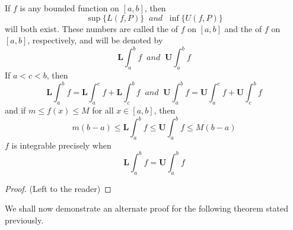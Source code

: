 \documentclass[12pt, a4paper, oneside, openright, titlepage]{book}
\begin{document}
\begin{rmk}
    If $f$ is any bounded function on $[a,b]$, then \begin{equation}
        \sup\{L(f,P)\}\;\;and\;\;\inf\{U(f,P)\}
    \end{equation}
    will both exist. These numbers are called the  of $f$ on $[a,b]$ and the  of $f$ on $[a,b]$, respectively, and will be denoted by \begin{equation}
        \mathbf{L}\int_a^bf\;\;and\;\;\mathbf{U}\int_a^bf
    \end{equation}
    If $a < c < b$, then \begin{equation}
        \mathbf{L}\int_a^bf = \mathbf{L}\int_a^cf + \mathbf{L}\int_c^bf\;\;and\;\;\mathbf{U}\int_a^bf = \mathbf{U}\int_a^cf + \mathbf{U}\int_c^bf
    \end{equation}
    and if $m \leq f(x) \leq M$ for all $x \in [a,b]$, then \begin{equation}
        m(b-a)\leq \mathbf{L}\int_a^bf \leq \mathbf{U}\int_a^bf\leq M(b-a)
    \end{equation}
    $f$ is integrable precisely when \begin{equation}
        \mathbf{L}\int_a^bf = \mathbf{U}\int_a^bf
    \end{equation}
\end{rmk}
\begin{proof}
    (Left to the reader)
\end{proof}


\begin{rmk}
    We shall now demonstrate an alternate proof for the following theorem stated previously.
\end{rmk}
\end{document}
